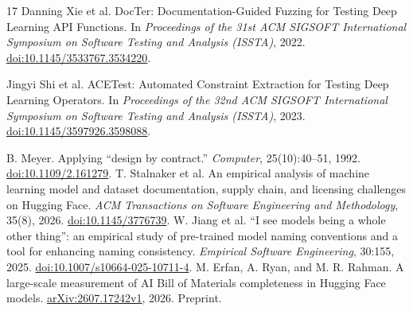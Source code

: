 \documentclass[10pt,twocolumn,letterpaper]{article}
\begin{document}
\begin{thebibliography}{17}
 Danning Xie et al. DocTer: Documentation-Guided Fuzzing for Testing Deep Learning API Functions. In \emph{Proceedings of the 31st ACM SIGSOFT International Symposium on Software Testing and Analysis (ISSTA)}, 2022. \href{https://doi.org/10.1145/3533767.3534220}{doi:10.1145/3533767.3534220}.

 Jingyi Shi et al. ACETest: Automated Constraint Extraction for Testing Deep Learning Operators. In \emph{Proceedings of the 32nd ACM SIGSOFT International Symposium on Software Testing and Analysis (ISSTA)}, 2023. \href{https://doi.org/10.1145/3597926.3598088}{doi:10.1145/3597926.3598088}.

 B. Meyer. Applying ``design by contract.'' \emph{Computer}, 25(10):40--51, 1992. \href{https://doi.org/10.1109/2.161279}{doi:10.1109/2.161279}.
 T. Stalnaker et al. An empirical analysis of machine learning model and dataset documentation, supply chain, and licensing challenges on Hugging Face. \emph{ACM Transactions on Software Engineering and Methodology}, 35(8), 2026. \href{https://doi.org/10.1145/3776739}{doi:10.1145/3776739}.
 W. Jiang et al. ``I see models being a whole other thing'': an empirical study of pre-trained model naming conventions and a tool for enhancing naming consistency. \emph{Empirical Software Engineering}, 30:155, 2025. \href{https://doi.org/10.1007/s10664-025-10711-4}{doi:10.1007/s10664-025-10711-4}.
 M. Erfan, A. Ryan, and M. R. Rahman. A large-scale measurement of AI Bill of Materials completeness in Hugging Face models. \href{https://arxiv.org/abs/2607.17242v1}{arXiv:2607.17242v1}, 2026. Preprint.
\end{thebibliography}
\end{document}
